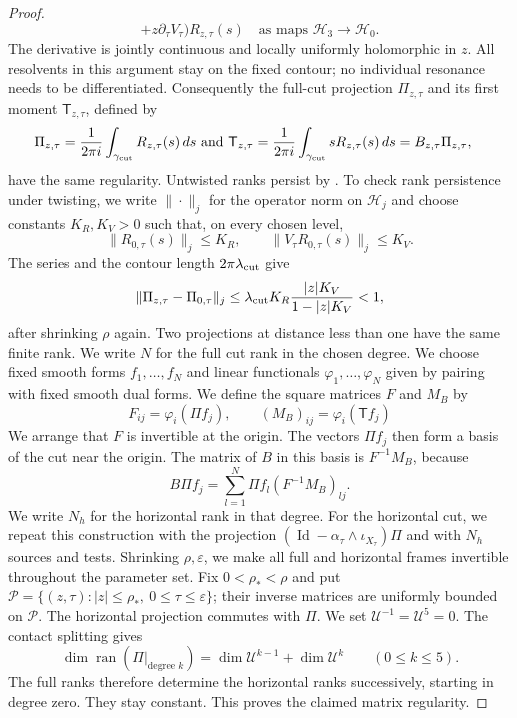 \documentclass[11pt,letterpaper,reqno]{amsart}
\theoremstyle{remark}
\newcommand{\Id}{\operatorname{Id}}
\newcommand{\ran}{\operatorname{ran}}
\newcommand{\cH}{\mathcal H}
\newcommand{\cU}{\mathcal U}
\begin{document}
\begin{proof}
\begin{equation}
                    +z\partial_\tau V_\tau)R_{z,\tau}(s)
 \quad\text{as maps }\cH_3\to\cH_0.
\end{equation}
The derivative is jointly continuous and locally uniformly holomorphic
in $z$. All resolvents in this argument stay on the fixed contour;
no individual resonance needs to be differentiated.
Consequently the full-cut projection $\Pi_{z,\tau}$ and its first
moment $\mathsf T_{z,\tau}$, defined by
\begin{equation}\label{xp:projector-moment}
 \begin{aligned}
 \Pi_{z,\tau}&=\frac1{2\pi i}
     \int_{\gamma_{\rm cut}} R_{z,\tau}(s)\,ds \text{ and }
 \mathsf T_{z,\tau}=\frac1{2\pi i}
     \int_{\gamma_{\rm cut}} sR_{z,\tau}(s)\,ds
     =B_{z,\tau}\Pi_{z,\tau},
 \end{aligned}
\end{equation}
have the same regularity. Untwisted ranks persist by
\cite[Appendix B.6]{CD}. To check rank persistence under twisting,
we write $\|\cdot\|_j$ for the operator norm on $\cH_j$ and choose
constants $K_R,K_V>0$ such that, on every chosen level,
\[
 \|R_{0,\tau}(s)\|_j\leq K_R,
 \qquad\|V_\tau R_{0,\tau}(s)\|_j\leq K_V.
\]
The series and the contour length $2\pi\lambda_{\rm cut}$ give
\[
 \|\Pi_{z,\tau}-\Pi_{0,\tau}\|_j
 \leq\lambda_{\rm cut}K_R\frac{|z|K_V}{1-|z|K_V}<1,
\]
after shrinking $\rho$ again. Two projections at distance less than
one have the same finite rank.
We write $N$ for the full cut rank in the chosen degree.
We choose fixed smooth forms $f_1,\ldots,f_N$ and linear functionals
$\varphi_1,\ldots,\varphi_N$ given by pairing with fixed smooth dual
forms. We define the square matrices $F$ and $M_B$ by
\begin{equation}\label{xp:frame-matrices}
 F_{ij}=\varphi_i(\Pi f_j),\qquad (M_B)_{ij}=\varphi_i(\mathsf T f_j)
\end{equation}
We arrange that $F$ is invertible at the origin.
The vectors $\Pi f_j$ then form a basis of the cut near the origin.
The matrix of $B$ in this basis is $F^{-1}M_B$, because
\[
 B\Pi f_j=\sum_{l=1}^N\Pi f_l(F^{-1}M_B)_{lj}.
\]
We write $N_h$ for the horizontal rank in that degree. For the horizontal
cut, we repeat this construction with the projection
$(\Id-\alpha_\tau\wedge\iota_{X_\tau})\Pi$ and with $N_h$ sources
and tests.
Shrinking $\rho,\varepsilon$, we make all full and horizontal frames
invertible throughout the parameter set. Fix $0<\rho_*<\rho$ and put
$\mathcal P=\{(z,\tau):|z|\le\rho_*,\ 0\le\tau\le\varepsilon\}$;
their inverse matrices are uniformly bounded on $\mathcal P$.
The horizontal projection commutes with $\Pi$. We set
$\cU^{-1}=\cU^5=0$. The contact splitting gives
\[
 \dim\ran(\Pi|_{\text{degree }k})
 =\dim\cU^{k-1}+\dim\cU^k\qquad(0\leq k\leq5).
\]
The full ranks therefore determine the horizontal ranks successively,
starting in degree zero. They stay constant. This proves the claimed
matrix regularity.


\end{proof}
\end{document}
